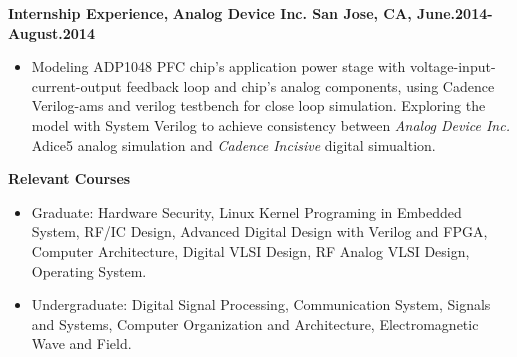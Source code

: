 \documentclass[]{article}
\begin{document}
\noindent \textbf{Internship Experience,}
\textbf{Analog Device Inc. San Jose, CA, June.2014-August.2014}
    \begin{itemize}
        \item Modeling ADP1048 PFC chip's application power stage with
        voltage-input-current-output feedback loop and chip's analog components,
        using Cadence Verilog-ams and verilog testbench for close loop
        simulation. Exploring the model with System Verilog to achieve
        consistency between \textit{Analog Device Inc.} Adice5 analog simulation
        and \textit{Cadence Incisive} digital simualtion. 
    \end{itemize}

\noindent \textbf{Relevant Courses}
\begin{itemize}
\item Graduate:
                    Hardware Security, Linux Kernel Programing in Embedded System, RF/IC Design,
                    Advanced Digital Design with Verilog and FPGA, Computer
                    Architecture, Digital VLSI Design, RF Analog VLSI Design,
                    Operating System.
\item Undergraduate:
                    Digital Signal Processing, Communication System, Signals
                    and Systems, Computer Organization and 
                    Architecture, Electromagnetic Wave and Field. 
\end{itemize}

\end{document}
